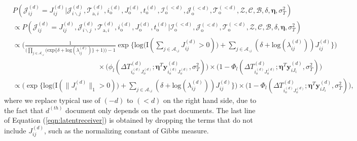    \begin{equation}
   \begin{aligned}
   &P(\mathcal{J}^{(d)}_{ij} = {J}^{(d)}_{ij}|\mathcal{J}^{(d)}_{i\backslash j}, \mathcal{T}^{(d)}_{\mbox{a}, i}, i^{(d)}_{\mbox{o}}, J^{(d)}_{\mbox{o}}, t^{(d)}_{\mbox{o}}, \mathcal{I}^{(<d)}_{\mbox{o}}, \mathcal{J}^{(<d)}_{\mbox{o}}, \mathcal{T}^{(<d)}_{\mbox{o}}, \mathcal{Z}, \mathcal{C}, \mathcal{B}, \delta, \boldsymbol{\eta}, \sigma_T^2)\\&\propto P(\mathcal{J}^{(d)}_{ij} ={J}^{(d)}_{ij}, \mathcal{J}^{(d)}_{i\backslash j}, \mathcal{T}^{(d)}_{\mbox{a}, i}, i^{(d)}_{\mbox{o}}, J^{(d)}_{\mbox{o}}, t^{(d)}_{\mbox{o}}| \mathcal{I}^{(<d)}_{\mbox{o}}, \mathcal{J}^{(<d)}_{\mbox{o}}, \mathcal{T}^{(<d)}_{\mbox{o}}, \mathcal{Z}, \mathcal{C}, \mathcal{B}, \delta, \boldsymbol{\eta}, \sigma_T^2)
   \\&\propto\Big( \frac{1}{\Big(\prod_{j \in \mathcal{A}_{\backslash i}} \Big(\mbox{exp}\{\delta+\mbox{log}(\lambda_{ij}^{(d)})\} + 1\Big)\Big)-1}\exp\Big\{\mbox{log}\big(\text{I}( \sum_{j \in \mathcal{A}_{\backslash i}} J^{(d)}_{ij} > 0 )\big) +\sum_{j \in \mathcal{A}_{\backslash i}} (\delta+\mbox{log}(\lambda_{ij}^{(d)}))J_{ij}^{(d)} \Big\}\Big)\\&\quad\quad\quad\quad\quad\quad\quad\quad\quad\quad\quad\quad\times \Big(\phi_l(\Delta T^{(d)}_{i_o^{(d)}J_o^{(d)}}; \boldsymbol{\eta}^T\boldsymbol{y}^{(d)}_{i_o^{(d)}J_o^{(d)}}, \sigma_T^2)\Big)\times \Big(1 - \Phi_l(\Delta T^{(d)}_{i_o^{(d)}J_o^{(d)}};\boldsymbol{\eta}^T\boldsymbol{y}^{(d)}_{iJ_i}, \sigma_T^2)\Big)
   \\& \propto \Big(\exp\Big\{\mbox{log}\big(\text{I}( \lVert J_i^{(d)} \rVert_1 > 0 )\big) +\sum_{j \in \mathcal{A}_{\backslash i}} (\delta+\mbox{log}(\lambda_{ij}^{(d)}))J_{ij}^{(d)} \Big\}\Big)\times  \Big( 1 - \Phi_l(\Delta T^{(d)}_{i_o^{(d)}J_o^{(d)}};\boldsymbol{\eta}^T\boldsymbol{y}^{(d)}_{iJ_i}, \sigma_T^2)\Big),
   \end{aligned}\label{eqn:latentreceiver}
   \end{equation}
   where we replace typical use of $(-d)$ to $(<d)$ on the right hand side, due to the fact that $d^{(th)}$ document only depends on the past documents. The last line of Equation (\ref{eqn:latentreceiver}) is obtained by dropping the terms that do not include $J^{(d)}_{ij}$, such as the normalizing constant of Gibbs measure. 
   
